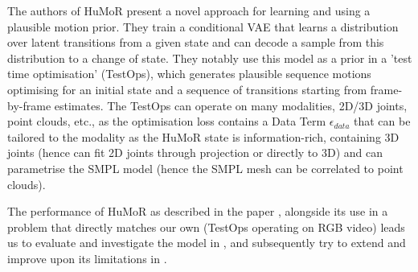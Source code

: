 The authors of HuMoR \cite{humor} present a novel approach for learning and using a plausible motion prior. They train a conditional VAE that learns a distribution over latent transitions from a given state and can decode a sample from this distribution to a change of state. They notably use this model as a prior in a 'test time optimisation' (TestOps), which generates plausible sequence motions optimising for an initial state and a sequence of transitions starting from frame-by-frame estimates. The TestOps can operate on many modalities, 2D/3D joints, point clouds, etc., as the optimisation loss contains a Data Term $\epsilon_{data}$ that can be tailored to the modality as the HuMoR state is information-rich, containing 3D joints (hence can fit 2D joints through projection or directly to 3D) and can parametrise the SMPL model (hence the SMPL mesh can be correlated to point clouds). 

The performance of HuMoR as described in the paper \cite{humor}, alongside its use in a problem that directly matches our own (TestOps operating on RGB video) leads us to evaluate and investigate the model in , and subsequently try to extend and improve upon its limitations in .
